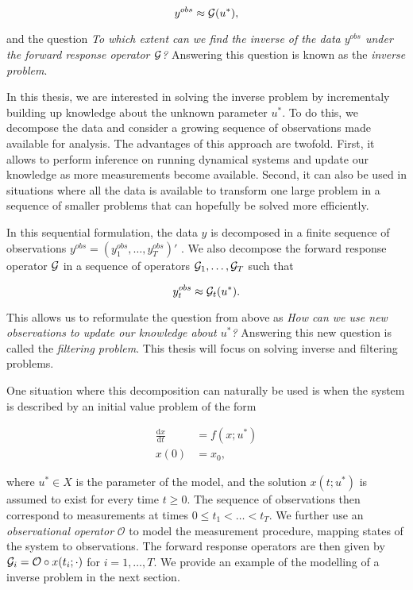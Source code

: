 \begin{equation}\label{inverse-formula}
  y^{obs} \approx \mathcal{G}(u^*),
\end{equation}

and the question \textit{To which extent can we find the \textit{inverse} of the data $y^{obs}$ under the forward response operator $\mathcal{G}$?} Answering this question is known as the \textit{inverse problem}.

In this thesis, we are interested in solving the inverse problem by incrementaly building up knowledge about the unknown parameter $u^*$. To do this, we decompose the data and consider a growing sequence of observations made available for analysis. The advantages of this approach are twofold. First, it allows to perform inference on running dynamical systems and update our knowledge as more measurements become available. Second, it can also be used in situations where all the data is available to transform one large problem in a sequence of smaller problems that can hopefully be solved more efficiently.

In this sequential formulation, the data $y$ is decomposed in a finite sequence of observations $y^{obs} = (y^{obs}_1, \ldots, y^{obs}_T)'$ . We also decompose the forward response operator $\mathcal{G}$ in a sequence of operators $\mathcal{G}_1, \ldots, \mathcal{G}_T$ such that

\begin{equation*}
  y^{obs}_t\approx \mathcal{G}_t(u^*).
\end{equation*}


This allows us to reformulate the question from above as \textit{How can we use new observations to update our knowledge about $u^*$?} Answering this new question is called the \textit{filtering problem}. This thesis will focus on solving inverse and filtering problems.

One situation where this decomposition can naturally be used is when the system is described by an initial value problem of the form

\begin{equation}
  \begin{aligned}
    \frac{\text{d}x}{\text{d}t} &= f(x; u^*)\\
    x(0) &= x_0,
  \end{aligned}
\end{equation}  

where $u^* \in X$ is the parameter of the model, and the solution $x(t; u^*)$ is assumed to exist for every time $t \geq 0$. The sequence of observations then correspond to measurements at times  $0 \leq t_1 < \ldots < t_T$. We further use an \textit{observational operator} $\mathcal{O}$ to model the measurement procedure, mapping states of the system to observations. The forward response operators are then given by $\mathcal{G}_i = \mathcal{O} \circ x(t_i; \cdot)$ for $i = 1, \ldots, T$. We provide an example of the modelling of a inverse problem in the next section.


